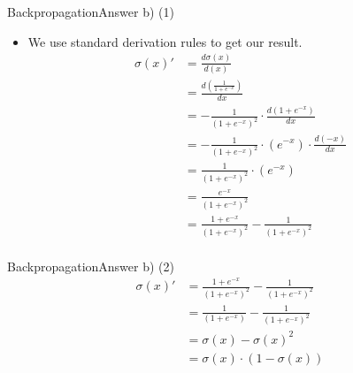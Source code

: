 \documentclass[t]{beamer}
\begin{document}
\begin{frame}{Backpropagation}{Answer b) (1)}
    \begin{itemize}
        \item We use standard derivation rules to get our result.
              \begin{align*}
                  \sigma(x)' & = \frac{d\sigma(x)}{d(x)}                                      \\
                             & = \frac{d(\frac{1}{1+e^{-x}})}{dx}                             \\
                             & = -\frac{1}{(1+e^{-x})^2}\cdot \frac{d(1+e^{-x})}{dx}          \\
                             & = -\frac{1}{(1+e^{-x})^2}\cdot (e^{-x}) \cdot \frac{d(-x)}{dx} \\
                             & = \frac{1}{(1+e^{-x})^2}\cdot (e^{-x})                         \\
                             & = \frac{e^{-x}}{(1+e^{-x})^2}                                  \\
                             & = \frac{1+e^{-x}}{(1+e^{-x})^2} - \frac{1}{(1+e^{-x})^2}       \\
              \end{align*}
    \end{itemize}
\end{frame}

\begin{frame}{Backpropagation}{Answer b) (2)}
    \begin{align*}
        \sigma(x)' & = \frac{1+e^{-x}}{(1+e^{-x})^2} - \frac{1}{(1+e^{-x})^2} \\
                   & = \frac{1}{(1+e^{-x})} - \frac{1}{(1+e^{-x})^2}          \\
                   & = \sigma(x)-\sigma(x)^2                                  \\
                   & = \sigma(x)\cdot (1-\sigma(x))
    \end{align*}
\end{frame}
\end{document}
